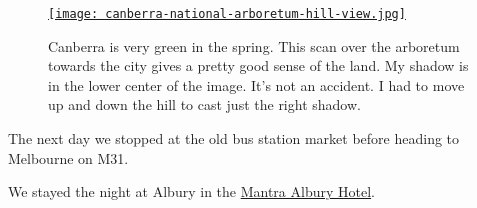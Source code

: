 \captionsetup[figure]{labelformat=empty}
\begin{figure}[htbp]
\centering
\href{https://conceptcontrol.smugmug.com/Trips/Overseas/Australia-New-Zealand-2022/i-693fxcR/A}{\texttt{[image: canberra-national-arboretum-hill-view.jpg]}}
\caption[Canberra is very green in the spring]{Canberra is very green in the spring. This scan over the
arboretum towards the city gives a pretty good sense of the land. My
shadow is in the lower center of the image. It's not an accident. I had
to move up and down the hill to cast just the right shadow.}
\label{fig:7548x3}
\end{figure}


The next day we stopped at the old bus station market before heading to
Melbourne on M31.

We stayed the night at Albury in the
\href{https://www.mantraalbury.com.au/}{Mantra Albury Hotel}.

%
